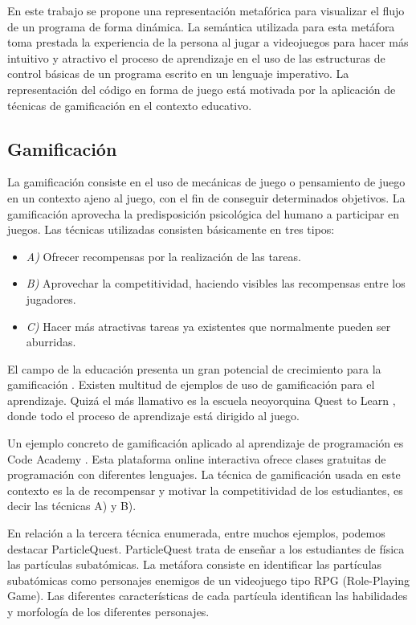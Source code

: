 \documentclass{llncs}
\begin{document}
En este trabajo se propone una representación metafórica para visualizar el flujo de un programa de forma dinámica. La semántica utilizada para esta metáfora toma prestada la experiencia de la persona al jugar a videojuegos para hacer más intuitivo y atractivo el proceso de aprendizaje en el uso de las estructuras de control básicas de un programa escrito en un lenguaje imperativo. La representación del código en forma de juego está motivada por la aplicación de técnicas de gamificación en el contexto educativo.


\subsection{Gamificación}
\label{subsec:gamification}

La gamificación consiste en el uso de mecánicas de juego o pensamiento de juego en un contexto ajeno al juego, con el fin de conseguir determinados objetivos. La gamificación aprovecha la predisposición psicológica del humano a participar en juegos. Las técnicas utilizadas consisten básicamente en tres tipos:
\begin{itemize}
\item {\em A)} Ofrecer recompensas por la realización de las tareas. 
\item {\em B)} Aprovechar la competitividad, haciendo visibles las recompensas entre los jugadores.
\item {\em C)} Hacer más atractivas tareas ya existentes que normalmente pueden ser aburridas. 
\end{itemize}

El campo de la educación presenta un gran potencial de crecimiento para la gamificación \cite{lee2011gamification}. Existen multitud de ejemplos de uso de gamificación para el aprendizaje. Quizá el más llamativo es la escuela neoyorquina Quest to Learn \cite{salen2011quest}, donde todo el proceso de aprendizaje está dirigido al juego. 

Un ejemplo concreto de gamificación aplicado al aprendizaje de programación es Code Academy \cite{codecademy}. Esta plataforma online interactiva ofrece clases gratuitas de programación con diferentes lenguajes. La técnica de gamificación usada en este contexto es la de recompensar y motivar la competitividad de los estudiantes, es decir las técnicas A) y B). 

En relación a la tercera técnica enumerada, entre muchos ejemplos, podemos destacar ParticleQuest. ParticleQuest trata de enseñar a los estudiantes de física las partículas subatómicas. La metáfora consiste en identificar las partículas subatómicas como personajes enemigos de un videojuego tipo RPG (Role-Playing Game). Las diferentes características de cada partícula identifican las habilidades y morfología de los diferentes personajes. 
\end{document}
